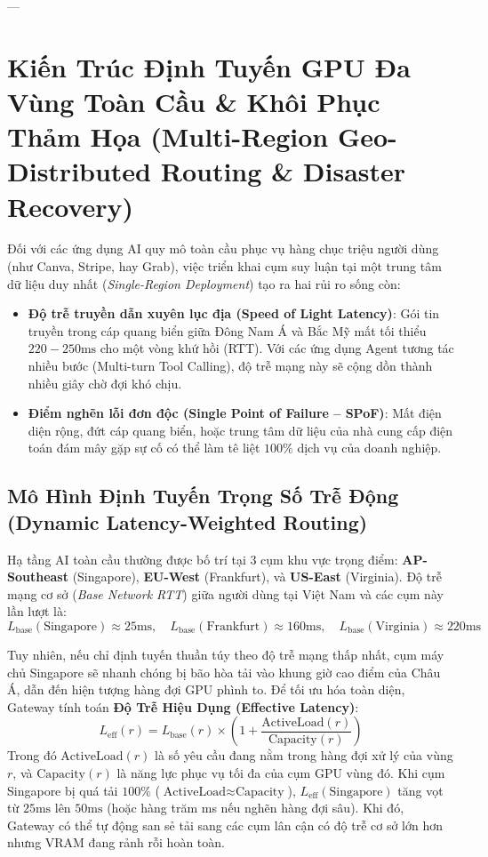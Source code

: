 ---

\section{Kiến Trúc Định Tuyến GPU Đa Vùng Toàn Cầu \& Khôi Phục Thảm Họa (Multi-Region Geo-Distributed Routing \& Disaster Recovery)}
\label{sec:ch13-multi-region-routing}

Đối với các ứng dụng AI quy mô toàn cầu phục vụ hàng chục triệu người dùng (như Canva, Stripe, hay Grab), việc triển khai cụm suy luận tại một trung tâm dữ liệu duy nhất (\textit{Single-Region Deployment}) tạo ra hai rủi ro sống còn:
\begin{itemize}
  \item \textbf{Độ trễ truyền dẫn xuyên lục địa (Speed of Light Latency)}: Gói tin truyền trong cáp quang biển giữa Đông Nam Á và Bắc Mỹ mất tối thiểu $220 - 250\text{ms}$ cho một vòng khứ hồi (RTT). Với các ứng dụng Agent tương tác nhiều bước (Multi-turn Tool Calling), độ trễ mạng này sẽ cộng dồn thành nhiều giây chờ đợi khó chịu.
  \item \textbf{Điểm nghẽn lỗi đơn độc (Single Point of Failure -- SPoF)}: Mất điện diện rộng, đứt cáp quang biển, hoặc trung tâm dữ liệu của nhà cung cấp điện toán đám mây gặp sự cố có thể làm tê liệt $100\%$ dịch vụ của doanh nghiệp.
\end{itemize}

\subsection{Mô Hình Định Tuyến Trọng Số Trễ Động (Dynamic Latency-Weighted Routing)}
Hạ tầng AI toàn cầu thường được bố trí tại 3 cụm khu vực trọng điểm: \textbf{AP-Southeast} (Singapore), \textbf{EU-West} (Frankfurt), và \textbf{US-East} (Virginia).
Độ trễ mạng cơ sở (\textit{Base Network RTT}) giữa người dùng tại Việt Nam và các cụm này lần lượt là:
\begin{equation}
L_{\text{base}}(\text{Singapore}) \approx 25\text{ms}, \quad L_{\text{base}}(\text{Frankfurt}) \approx 160\text{ms}, \quad L_{\text{base}}(\text{Virginia}) \approx 220\text{ms}
\end{equation}

Tuy nhiên, nếu chỉ định tuyến thuần túy theo độ trễ mạng thấp nhất, cụm máy chủ Singapore sẽ nhanh chóng bị bão hòa tải vào khung giờ cao điểm của Châu Á, dẫn đến hiện tượng hàng đợi GPU phình to.
Để tối ưu hóa toàn diện, Gateway tính toán \textbf{Độ Trễ Hiệu Dụng (Effective Latency)}:
\begin{equation}
L_{\text{eff}}(r) = L_{\text{base}}(r) \times \left(1 + \frac{\text{ActiveLoad}(r)}{\text{Capacity}(r)}\right)
\label{eq:effective-latency}
\end{equation}
Trong đó $\text{ActiveLoad}(r)$ là số yêu cầu đang nằm trong hàng đợi xử lý của vùng $r$, và $\text{Capacity}(r)$ là năng lực phục vụ tối đa của cụm GPU vùng đó.
Khi cụm Singapore bị quá tải $100\%$ ($\text{ActiveLoad} \approx \text{Capacity}$), $L_{\text{eff}}(\text{Singapore})$ tăng vọt từ $25\text{ms}$ lên $50\text{ms}$ (hoặc hàng trăm ms nếu nghẽn hàng đợi sâu). Khi đó, Gateway có thể tự động san sẻ tải sang các cụm lân cận có độ trễ cơ sở lớn hơn nhưng VRAM đang rảnh rỗi hoàn toàn.

